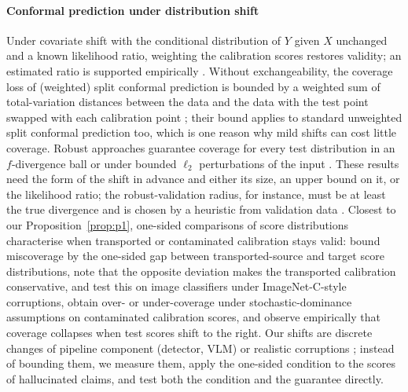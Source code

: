\paragraph{Conformal prediction under distribution shift} Under covariate shift with the conditional distribution of $Y$ given $X$ unchanged and a known likelihood ratio, weighting the calibration scores restores validity; an estimated ratio is supported empirically \citep{tibshirani2019covariate}. Without exchangeability, the coverage loss of (weighted) split conformal prediction is bounded by a weighted sum of total-variation distances between the data and the data with the test point swapped with each calibration point \citep[Theorem~2]{barber2023beyond}; their bound applies to standard unweighted split conformal prediction too, which is one reason why mild shifts can cost little coverage. Robust approaches guarantee coverage for every test distribution in an $f$-divergence ball \citep{cauchois2024robust} or under bounded $\ell_2$ perturbations of the input \citep{gendler2022adversarially}. These results need the form of the shift in advance and either its size, an upper bound on it, or the likelihood ratio; the robust-validation radius, for instance, must be at least the true divergence and is chosen by a heuristic from validation data \citep[Sec.~3]{cauchois2024robust}. Closest to our Proposition~\ref{prop:p1}, one-sided comparisons of score distributions characterise when transported or contaminated calibration stays valid: \citet{doula2026conformal} bound miscoverage by the one-sided gap between transported-source and target score distributions, note that the opposite deviation makes the transported calibration conservative, and test this on image classifiers under ImageNet-C-style corruptions, \citet{clarkson2024split} obtain over- or under-coverage under stochastic-dominance assumptions on contaminated calibration scores, and \citet{lee2026diagnosing} observe empirically that coverage collapses when test scores shift to the right. Our shifts are discrete changes of pipeline component (detector, VLM) or realistic corruptions \citep{hendrycks2019benchmarking}; instead of bounding them, we measure them, apply the one-sided condition to the scores of hallucinated claims, and test both the condition and the guarantee directly.

